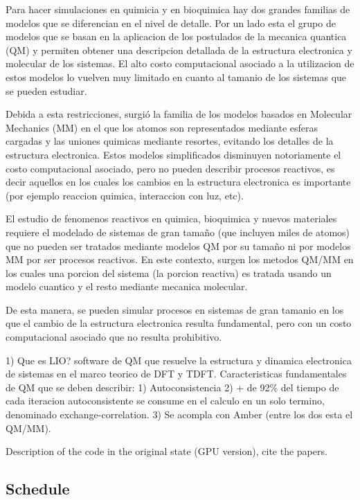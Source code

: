 \documentclass[a4paper,10pt]{article}
\begin{document}
Para hacer simulaciones en quimicia y en bioquimica hay dos grandes familias de modelos que se diferencian en el nivel de detalle.
Por un lado esta el grupo de modelos que se basan en la aplicacion de los postulados de la mecanica quantica (QM) y permiten obtener una descripcion detallada de la estructura electronica y molecular de los sistemas.
El alto costo computacional asociado a la utilizacion de estos modelos lo vuelven muy limitado en cuanto al tamanio de los sistemas  que se pueden estudiar.

Debida a esta restricciones, surgi\'o la familia de los modelos basados en Molecular Mechanics (MM) en el que los atomos son representados mediante esferas cargadas y las uniones quimicas mediante resortes, evitando los detalles de la estructura electronica.
Estos modelos simplificados disminuyen notoriamente el costo computacional asociado, pero no pueden describir procesos reactivos, es decir aquellos en los cuales los cambios en la estructura electronica es importante (por ejemplo reaccion quimica, interaccion con luz, etc).

El estudio de fenomenos reactivos en quimica, bioquimica y nuevos materiales requiere el modelado de sistemas de gran tama\~no (que incluyen miles de atomos) que no pueden ser tratados mediante modelos QM por su tama\~no ni por modelos MM por ser procesos reactivos.
En este contexto, surgen los metodos QM/MM en los cuales una porcion del sistema (la porcion reactiva) es tratada usando un modelo cuantico y el resto mediante mecanica molecular. 

De esta manera, se pueden simular procesos en sistemas de gran tamanio en los que el cambio de la estructura electronica resulta fundamental, pero con un costo computacional asociado que no resulta prohibitivo.

1) Que es LIO? software de QM que resuelve la estructura y dinamica electronica de sistemas en el marco teorico de DFT y TDFT.
Caracteristicas fundamentales de QM que se deben describir:
1) Autoconsistencia
2) + de 92\% del tiempo de cada iteracion autoconsistente se consume en el calculo en un solo termino, denominado exchange-correlation.
3) Se acompla con Amber (entre los dos esta el QM/MM).

Description of the code in the original state (GPU version), cite the papers. 









\subsection{Schedule} 
\end{document}
